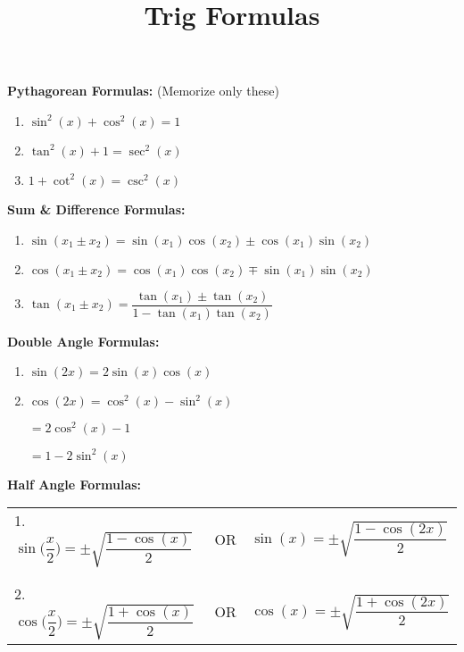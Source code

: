 \documentclass[12pt]{article}
\begin{document}
\title{Trig Formulas}
\date{}
\author{}
\maketitle

\textbf{Pythagorean Formulas:} (Memorize only these)

\begin{enumerate}
\item $\sin^{2}(x) + \cos^{2}(x) = 1$
\item $\tan^{2}(x) + 1 = \sec^{2}(x)$
\item $1 + \cot^{2}(x) = \csc^{2}(x)$
\end{enumerate}

\vspace{1cm} 

\textbf{Sum \& Difference Formulas:}

\begin{enumerate}
\item $\sin(x_{1} \pm x_{2}) = \sin(x_{1}) \cos(x_{2}) \pm \cos(x_{1}) \sin(x_{2})$
\item $\cos(x_{1} \pm x_{2}) = \cos(x_{1}) \cos(x_{2}) \mp \sin(x_{1}) \sin(x_{2})$
\item $\tan(x_{1} \pm x_{2}) = \dfrac{\tan(x_{1}) \pm \tan(x_{2})}{1 - \tan(x_{1}) \tan(x_{2})}$
\end{enumerate}

\vspace{1cm} 

\textbf{Double Angle Formulas:}

\begin{enumerate}
\item $\sin(2x) = 2 \sin(x) \cos(x)$
\item $\cos(2x) = \cos^{2}(x) - \sin^{2}(x)$

\hspace{1.3cm} $= 2 \cos^{2}(x) - 1$

\hspace{1.3cm} $= 1 - 2 \sin^{2}(x)$
\end{enumerate}

\newpage

\textbf{Half Angle Formulas:}

\begin{tabular}{p{6cm}p{2cm}p{5cm}}
 1. $\sin\Big(\dfrac{x}{2}\Big) = \pm \sqrt{\dfrac{1-\cos(x)}{2}}$ & OR  & $\sin(x) = \pm \sqrt{\dfrac{1 - \cos(2x)}{2}}$
\\
\\
\\
 2. $\cos\Big(\dfrac{x}{2}\Big) = \pm \sqrt{\dfrac{1+\cos(x)}{2}}$ & OR  & $\cos(x) = \pm \sqrt{\dfrac{1 + \cos(2x)}{2}}$
\end{tabular}
\end{document}
